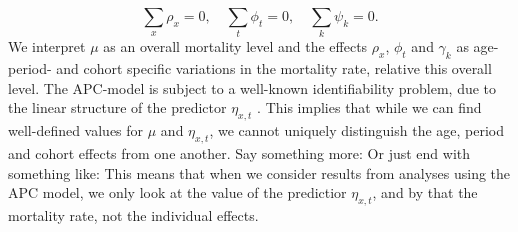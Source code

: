 \begin{equation}
    \sum_{x}\rho_x = 0, \quad \sum_{t}\phi_t = 0, \quad \sum_{k} \psi_k = 0. 
    \label{eq:APCconstraints}
\end{equation}
We interpret $\mu$ as an overall mortality level \parencite{RieblerThesis2010} and the effects $\rho_x$, $\phi_t$ and $\gamma_k$ as age- period- and cohort specific variations in the mortality rate, relative this overall level. 
\newpar The APC-model is subject to a well-known identifiability problem, due to the linear structure of the predictor $\eta_{x,t}$ \parencite{RieblerThesis2010}. This implies that while we can find well-defined values for $\mu$ and $\eta_{x,t}$, we cannot uniquely distinguish the age, period and cohort effects from one another. 
\textcolor{myDarkGreen}{Say something more: Or just end with something like: This means that when we consider results from analyses using the APC model, we only look at the value of the predictior $\eta_{x,t}$, and by that the mortality rate, not the individual effects. 
}

